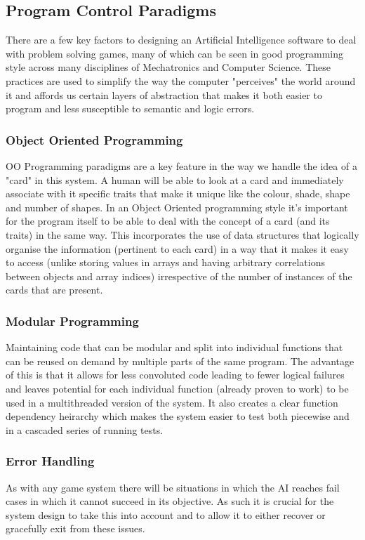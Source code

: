 \subsection{Program Control Paradigms}
There are a few key factors to designing an Artificial Intelligence software to deal with problem solving games, many of which can be seen in good programming style across many disciplines of Mechatronics and Computer Science. These practices are used to simplify the way the computer "perceives" the world around it and affords us certain layers of abstraction that makes it both easier to program and less susceptible to semantic and logic errors.

\subsubsection{Object Oriented Programming}
OO Programming paradigms are a key feature in the way we handle the idea of a "card" in this system. A human will be able to look at a card and immediately associate with it specific traits that make it unique like the colour, shade, shape and number of shapes. In an Object Oriented programming style it's important for the program itself to be able to deal with the concept of a card (and its traits) in the same way. This incorporates the use of data structures that logically organise the information (pertinent to each card) in a way that it makes it easy to access (unlike storing values in arrays and having arbitrary correlations between objects and array indices) irrespective of the number of instances of the cards that are present.


\subsubsection{Modular Programming}
Maintaining code that can be modular and split into individual functions that can be reused on demand by multiple parts of the same program. The advantage of this is that it allows for less convoluted code leading to fewer logical failures and leaves potential for each individual function (already proven to work) to be used in a multithreaded version of the system. It also creates a clear function dependency heirarchy which makes the system easier to test both piecewise and in a cascaded series of running tests.

\subsubsection{Error Handling}
As with any game system there will be situations in which the AI reaches fail cases in which it cannot succeed in its objective. As such it is crucial for the system design to take this into account and to allow it to either recover or gracefully exit from these issues.
